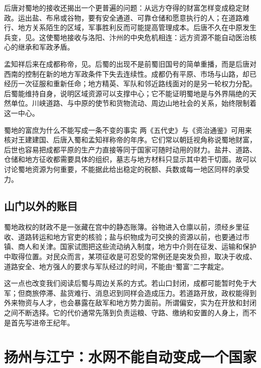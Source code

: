 后唐对蜀地的接收还揭出一个更普遍的问题：从远方夺得的财富怎样变成稳定财政。运出盐、布帛或谷物，要有安全通道、可靠仓储和愿意执行的人；在道路难行、地方关系陌生的区域，军事胜利反而可能提高管理成本。后唐不久在中原发生兵变，见。这使蜀地接收与洛阳、汴州的中央危机相连：远方资源不能自动医治核心的继承和军政矛盾。

孟知祥后来在成都称帝，见。后蜀的出现不是前蜀旧国号的简单重播，而是后唐对西南的控制在新的地方军政条件下失去连续性。成都仍有平原、市场与山路，却已经历一次征服和重新任命；地方精英、军队和邻近路线面对的是另一轮权力分配。后蜀能维持自身，说明区域资源可以支撑中心；它不能证明蜀地是与外界隔绝的天然单位。川峡道路、与中原的使节和货物流动、周边山地社会的关系，始终限制着这一中心。

\begin{sourcenote}{蜀地的富庶为什么不能写成一条不变的事实}
两《五代史》与《资治通鉴》可用来核对王建建国、后唐入蜀和孟知祥称帝的年序。它们常以朝廷视角称说蜀地财富，后世也容易把成都平原的生产力直接等同于国家可随时动用的财力。盐井、道路、仓储和地方征收都需要具体的组织，墓志与地方材料只显示其中若干切面。故可以讨论蜀地资源为何重要，不能据此给出稳定的税额、兵数或每一地区同样的承受力。
\end{sourcenote}

\subsection{山门以外的账目}

蜀地政权的财政不是一张藏在宫中的静态账簿。谷物进入仓廪以前，须经乡里征收、道路转运和地方官吏的核验；盐与织物成为可交换的资源以前，也要通过市镇、商人和关津。国家试图把这些流动纳入制度，地方中介则在征发、运输和保护中取得位置。对民众而言，某项征收是可忍受的常例还是突发负担，取决于收成、道路安全、地方强人的要求与军队经过的时间，不能由“蜀富”二字裁定。

这一点也改变我们阅读后蜀与周边关系的方式。若山口封闭，成都可能暂时免于大军；但商旅停滞、盐货难行、消息迟到同样会造成压力。若道路开放，政权能得到外来物资与人才，也会暴露在敌军和地方势力面前。所谓偏安，实为在开放和封闭之间不断选择。它的代价通常先落到负责运粮、守路、缴纳和安置的人身上，而不是首先写进帝王纪年。

\section{扬州与江宁：水网不能自动变成一个国家}

